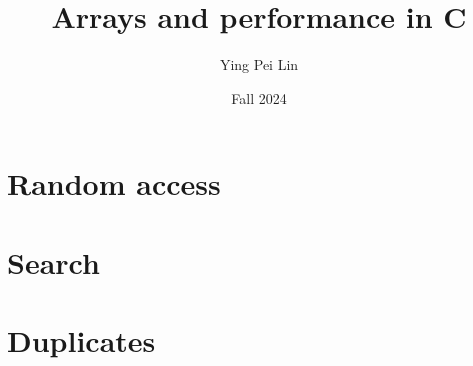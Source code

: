 \documentclass[a4paper,11pt]{article}
\begin{document}
\title{
    \textbf{Arrays and performance in C}
}
\author{Ying Pei Lin}
\date{Fall 2024}

\maketitle

\section*{Random access}

\section*{Search}

\section*{Duplicates}
\end{document}
